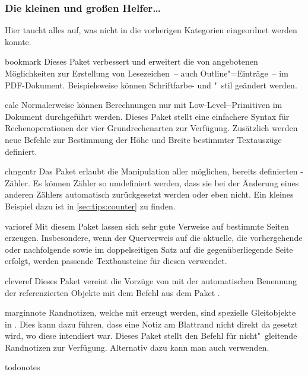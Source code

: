 \subsubsection{Die kleinen und großen Helfer\dots}
Hier taucht alles auf, was nicht in die vorherigen Kategorien eingeordnet 
werden konnte.
%
\begin{packages}
\item[bookmark]%
  Dieses Paket verbessert und erweitert die von  angebotenen 
  Möglichkeiten zur Erstellung von Lesezeichen~-- auch Outline"=Einträge~-- im 
  PDF-Dokument. Beispielsweise können Schriftfarbe- und "~stil geändert werden.
\item[calc]%
  Normalerweise können Berechnungen nur mit Low-Level--Primitiven 
  im Dokument durchgeführt werden. Dieses Paket stellt eine einfachere Syntax 
  für Rechenoperationen der vier Grundrechenarten zur Verfügung. Zusätzlich 
  werden neue Befehle zur Bestimmung der Höhe und Breite bestimmter Textauszüge 
  definiert.
\item[chngcntr]%
  Das Paket erlaubt die Manipulation aller möglichen, bereits definierten 
  -Zähler. Es können Zähler so umdefiniert werden, dass sie bei 
  der Änderung eines anderen Zählers automatisch zurückgesetzt werden oder eben 
  nicht. Ein kleines Beispiel dazu ist in \autoref{sec:tips:counter} zu finden.
\item[varioref]%
  Mit diesem Paket lassen sich sehr gute Verweise auf bestimmte Seiten 
  erzeugen. Insbesondere, wenn der Querverweis auf die aktuelle, die 
  vorhergehende oder nachfolgende sowie im doppelseitigen Satz auf die 
  gegenüberliegende Seite erfolgt, werden passende Textbausteine für diesen 
  verwendet.
\item[cleveref]%
  Dieses Paket vereint die Vorzüge von  mit der automatischen 
  Benennung der referenzierten Objekte mit dem Befehl  aus dem 
  Paket .
\item[marginnote]%
  Randnotizen, welche mit  erzeugt werden, sind spezielle 
  Gleitobjekte in . Dies kann dazu führen, dass eine Notiz am 
  Blattrand nicht direkt da gesetzt wird, wo diese intendiert war. Dieses Paket 
  stellt den Befehl  für nicht"~gleitende Randnotizen zur 
  Verfügung. Alternativ dazu kann man auch  verwenden.
\item[todonotes]%

\end{packages}
